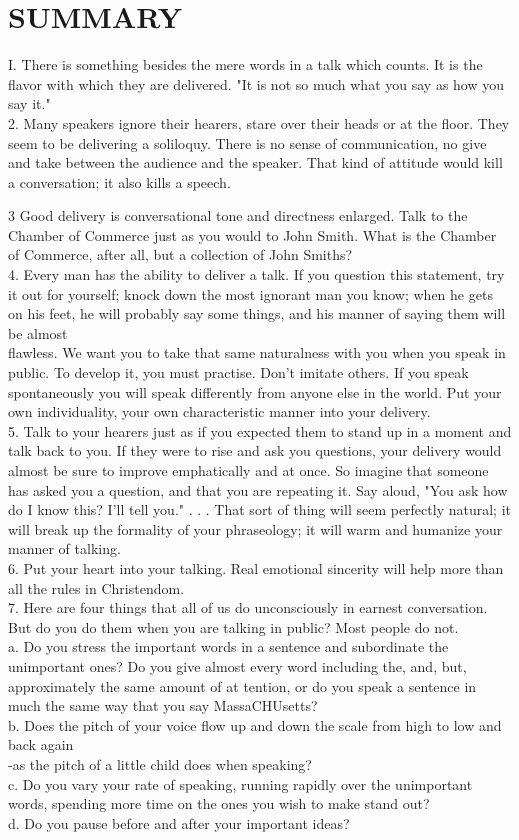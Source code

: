 \documentclass[10pt]{article}
\begin{document}
\section*{SUMMARY}
I. There is something besides the mere words in a talk which counts. It is the flavor with which they are delivered. "It is not so much what you say as how you say it."\\
2. Many speakers ignore their hearers, stare over their heads or at the floor. They seem to be delivering a soliloquy. There is no sense of communication, no give and take between the audience and the speaker. That kind of attitude would kill a conversation; it also kills a speech.

3 Good delivery is conversational tone and directness enlarged. Talk to the Chamber of Commerce just as you would to John Smith. What is the Chamber of Commerce, after all, but a collection of John Smiths?\\
4. Every man has the ability to deliver a talk. If you question this statement, try it out for yourself; knock down the most ignorant man you know; when he gets on his feet, he will probably say some things, and his manner of saying them will be almost\\
flawless. We want you to take that same naturalness with you when you speak in public. To develop it, you must practise. Don't imitate others. If you speak spontaneously you will speak differently from anyone else in the world. Put your own individuality, your own characteristic manner into your delivery.\\
5. Talk to your hearers just as if you expected them to stand up in a moment and talk back to you. If they were to rise and ask you questions, your delivery would almost be sure to improve emphatically and at once. So imagine that someone has asked you a question, and that you are repeating it. Say aloud, "You ask how do I know this? I'll tell you." . . . That sort of thing will seem perfectly natural; it will break up the formality of your phraseology; it will warm and humanize your manner of talking.\\
6. Put your heart into your talking. Real emotional sincerity will help more than all the rules in Christendom.\\
7. Here are four things that all of us do unconsciously in earnest conversation. But do you do them when you are talking in public? Most people do not.\\
a. Do you stress the important words in a sentence and subordinate the unimportant ones? Do you give almost every word including the, and, but, approximately the same amount of at tention, or do you speak a sentence in much the same way that you say MassaCHUsetts?\\
b. Does the pitch of your voice flow up and down the scale from high to low and back again\\
-as the pitch of a little child does when speaking?\\
c. Do you vary your rate of speaking, running rapidly over the unimportant words, spending more time on the ones you wish to make stand out?\\
d. Do you pause before and after your important ideas?
\end{document}
